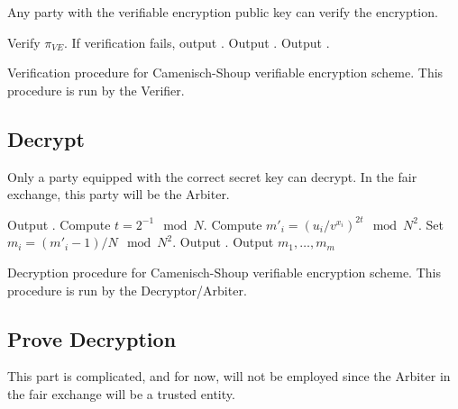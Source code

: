 Any party with the verifiable encryption public key can verify the encryption.



\begin{algorithm}[H]\label{verifyVE}
\dontprintsemicolon

\BlankLine

 \;
\Indp
  Verify $\pi_{VE}$. If verification fails, output \reject. \;
    {Output \accept. \;}
  \Else
    {Output \reject. \;}
\Indm

\caption{Verification procedure for Camenisch-Shoup verifiable encryption scheme. This procedure is run by the Verifier.}
\end{algorithm}





\subsection{Decrypt}
Only a party equipped with the correct secret key can decrypt. In the fair exchange, this party will be the Arbiter.


\begin{algorithm}[H]\label{decryptVE}
\dontprintsemicolon

\BlankLine

 \;
\Indp
    {Output \error. \;}
  Compute $t = 2^{-1} \mod N$. \;
    {Compute $m'_i = (u_i / v^{x_i})^{2t} \mod N^2$. \;
     Set $m_i = (m'_i - 1) / N \mod N^2$. \;
       {Output \error. \;}}
  Output $m_1,\ldots,m_m$ \;
\Indm

\caption{Decryption procedure for Camenisch-Shoup verifiable encryption scheme. This procedure is run by the Decryptor/Arbiter.}
\end{algorithm}




\subsection{Prove Decryption}
This part is complicated, and for now, will not be employed since the Arbiter in the fair exchange will be a trusted entity.
